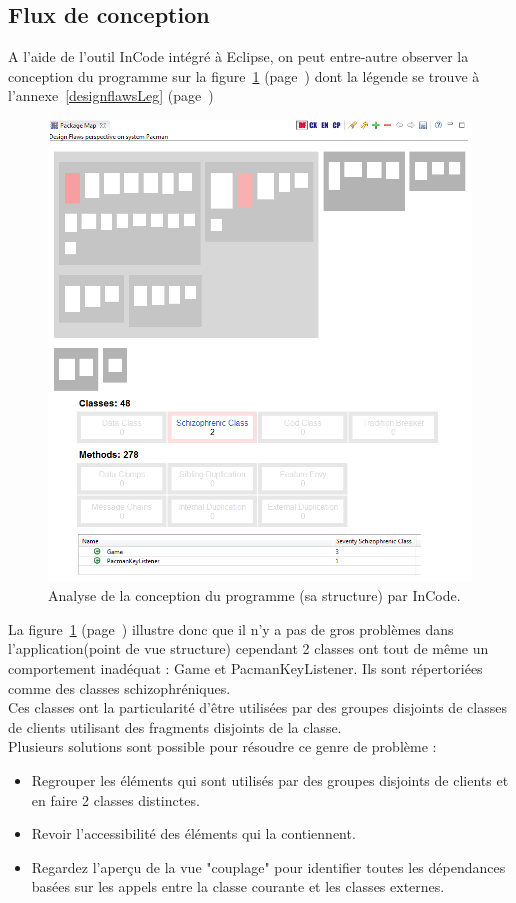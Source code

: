 \documentclass[12pt,a4paper,final]{article}
\newcommand{\annexe}[1]{annexe~\ref{#1} (page~\pageref{#1})}
\newcommand{\labelfigure}[1]{figure~\ref{#1} (page~\pageref{#1})}
\begin{document}
\subsection{Flux de conception}\label{designflaws}
A l'aide de l'outil InCode intégré à Eclipse, on peut entre-autre observer la conception du programme sur la \labelfigure{designflaws} dont la légende se trouve à l'\annexe{designflawsLeg}
\begin{figure}[!h]
	\centering
	\includegraphics[width=\textwidth]{InCodeDesignFlaws.png}
	\caption{\label{designflaws}Analyse de la conception du programme (sa structure) par InCode.}
\end{figure}
La \labelfigure{designflaws} illustre donc que il n'y a pas de gros problèmes dans l'application(point de vue structure) cependant 2 classes ont tout de même un comportement inadéquat : Game et PacmanKeyListener. Ils sont répertoriées comme des classes schizophréniques.\\
Ces classes ont la particularité  d'être utilisées par des groupes disjoints de classes de clients utilisant des fragments disjoints de la classe.\\
Plusieurs solutions sont possible pour résoudre ce genre de problème :
\begin{itemize}
\item Regrouper les éléments qui sont utilisés par des groupes disjoints de clients et en faire 2 classes distinctes.
\item Revoir l'accessibilité des éléments qui la contiennent.
\item Regardez l'aperçu de la vue "couplage" pour identifier toutes les dépendances basées sur les appels entre la classe courante et les classes externes.
\end{itemize}
\end{document}
